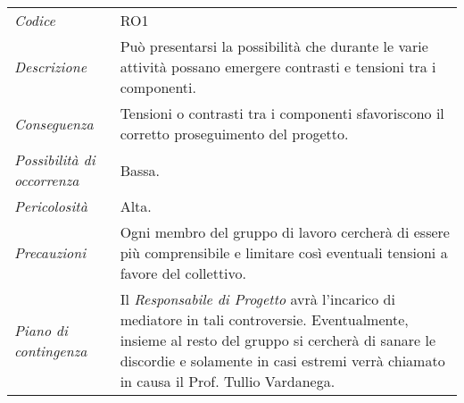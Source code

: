 {{{{{	\begin{center}
		\renewcommand{\arraystretch}{1.4}
		\begin{longtable}{|p{5cm}|p{12cm}|}
			\hline
			\rowcolor{airforceblue}
			\multicolumn{2}{|c|}{\textit{Contrasti tra i componenti}}\\
			\hline
			\textit{Codice} & RO1 \\
			\hline
			\textit{Descrizione} & Può presentarsi la possibilità che durante le varie attività possano emergere contrasti e tensioni tra i componenti. \\
			\hline
			\textit{Conseguenza} & Tensioni o contrasti tra i componenti sfavoriscono il corretto proseguimento del progetto. \\
			\hline
			\textit{Possibilità di occorrenza} & Bassa. \\
			\hline
			\textit{Pericolosità} & Alta. \\
			\hline
			\textit{Precauzioni} & Ogni membro del gruppo di lavoro cercherà di essere più comprensibile e limitare così eventuali tensioni a favore del collettivo. \\
			\hline
			\textit{Piano di contingenza} & Il \textit{Responsabile di Progetto} avrà l'incarico di mediatore in tali controversie.
			Eventualmente, insieme al resto del gruppo si cercherà di sanare le discordie e solamente in casi estremi verrà chiamato in causa il Prof. Tullio Vardanega.  \\
			\hline
		\end{longtable}
	\end{center}


\def\tabularxcolumn#1{m{#1}}
{

}}}}}}
